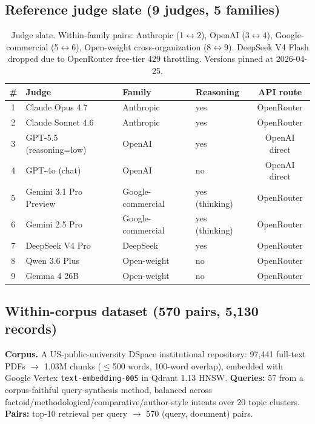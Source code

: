 \documentclass{article}
\begin{document}
\subsection{Reference judge slate (9 judges, 5 families)}

\begin{table}[h]
\centering\small
\caption{Judge slate. Within-family pairs: Anthropic (1$\leftrightarrow$2), OpenAI (3$\leftrightarrow$4), Google-commercial (5$\leftrightarrow$6), Open-weight cross-organization (8$\leftrightarrow$9). DeepSeek V4 Flash dropped due to OpenRouter free-tier 429 throttling. Versions pinned at 2026-04-25.}
\label{tab:judges}
\begin{tabular}{@{}clllc@{}}
\toprule
\# & Judge & Family & Reasoning & API route \\
\midrule
1 & Claude Opus 4.7 & Anthropic & yes & OpenRouter \\
2 & Claude Sonnet 4.6 & Anthropic & yes & OpenRouter \\
3 & GPT-5.5 (reasoning=low) & OpenAI & yes & OpenAI direct \\
4 & GPT-4o (chat) & OpenAI & no & OpenAI direct \\
5 & Gemini 3.1 Pro Preview & Google-commercial & yes (thinking) & OpenRouter \\
6 & Gemini 2.5 Pro & Google-commercial & yes (thinking) & OpenRouter \\
7 & DeepSeek V4 Pro & DeepSeek & yes & OpenRouter \\
8 & Qwen 3.6 Plus & Open-weight & no & OpenRouter \\
9 & Gemma 4 26B & Open-weight & no & OpenRouter \\
\bottomrule
\end{tabular}
\end{table}

\subsection{Within-corpus dataset (570 pairs, 5{,}130 records)}\label{sec:within}

\textbf{Corpus.} A US-public-university DSpace institutional repository: 97{,}441 full-text PDFs $\rightarrow$ 1.03M chunks ($\leq$500 words, 100-word overlap), embedded with Google Vertex \texttt{text-embedding-005} in Qdrant 1.13 HNSW. \textbf{Queries:} 57 from a corpus-faithful query-synthesis method, balanced across factoid/methodological/comparative/author-style intents over 20 topic clusters. \textbf{Pairs:} top-10 retrieval per query $\rightarrow$ 570 (query, document) pairs.
\end{document}
